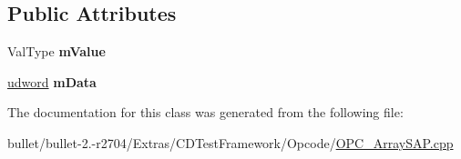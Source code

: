 \subsection*{Public Attributes}
\begin{DoxyCompactItemize}
\item 
\hypertarget{class_opcode_1_1_a_s_a_p___end_point_a278cda64be1e0ea7cfa802a5b70986e2}{Val\+Type {\bfseries m\+Value}}\label{class_opcode_1_1_a_s_a_p___end_point_a278cda64be1e0ea7cfa802a5b70986e2}

\item 
\hypertarget{class_opcode_1_1_a_s_a_p___end_point_a3d430987aacf09890dbcaba338cd89f3}{\hyperlink{_ice_types_8h_a44c6f1920ba5551225fb534f9d1a1733}{udword} {\bfseries m\+Data}}\label{class_opcode_1_1_a_s_a_p___end_point_a3d430987aacf09890dbcaba338cd89f3}

\end{DoxyCompactItemize}


The documentation for this class was generated from the following file\+:\begin{DoxyCompactItemize}
\item 
bullet/bullet-\/2.-\/r2704/\+Extras/\+C\+D\+Test\+Framework/\+Opcode/\hyperlink{_o_p_c___array_s_a_p_8cpp}{O\+P\+C\+\_\+\+Array\+S\+A\+P.\+cpp}\end{DoxyCompactItemize}
